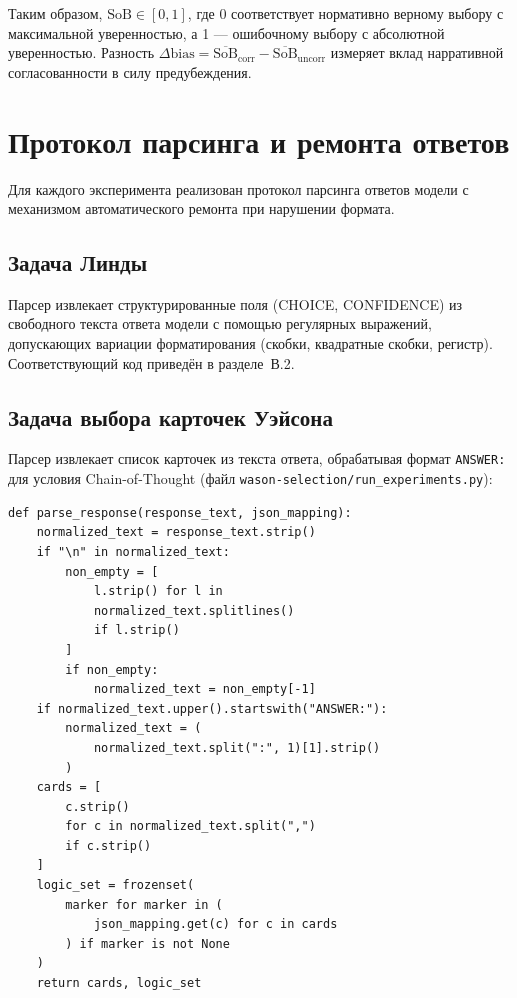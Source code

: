 Таким образом, $\text{SoB} \in [0, 1]$, где 0 соответствует нормативно верному выбору с максимальной уверенностью, а 1 --- ошибочному выбору с абсолютной уверенностью. Разность $\Delta\text{bias} = \overline{\text{SoB}}_{\text{corr}} - \overline{\text{SoB}}_{\text{uncorr}}$ измеряет вклад нарративной согласованности в силу предубеждения.

\section{Протокол парсинга и ремонта ответов}
\label{sec:appC_parsing}

Для каждого эксперимента реализован протокол парсинга ответов модели с механизмом автоматического ремонта при нарушении формата.

\subsection{Задача Линды}

Парсер извлекает структурированные поля (CHOICE, CONFIDENCE) из свободного текста ответа модели с помощью регулярных выражений, допускающих вариации форматирования (скобки, квадратные скобки, регистр). Соответствующий код приведён в разделе~В.2.

\subsection{Задача выбора карточек Уэйсона}

Парсер извлекает список карточек из текста ответа, обрабатывая формат \texttt{ANSWER:} для условия Chain-of-Thought (файл \texttt{wason-selection/run\_experiments.py}):

\begin{lstlisting}
def parse_response(response_text, json_mapping):
    normalized_text = response_text.strip()
    if "\n" in normalized_text:
        non_empty = [
            l.strip() for l in
            normalized_text.splitlines()
            if l.strip()
        ]
        if non_empty:
            normalized_text = non_empty[-1]
    if normalized_text.upper().startswith("ANSWER:"):
        normalized_text = (
            normalized_text.split(":", 1)[1].strip()
        )
    cards = [
        c.strip()
        for c in normalized_text.split(",")
        if c.strip()
    ]
    logic_set = frozenset(
        marker for marker in (
            json_mapping.get(c) for c in cards
        ) if marker is not None
    )
    return cards, logic_set
\end{lstlisting}

